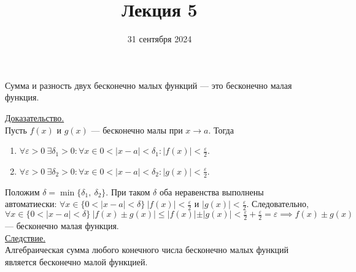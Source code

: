 \documentclass{article}
\title{Лекция 5}
\author{}
\date{31 сентября 2024}
\begin{document}
\maketitle

\begin{theorem}
    Сумма и разность двух бесконечно малых функций --- это бесконечно малая функция.
\end{theorem}
\noindent
\underline{Доказательство.}\\
Пусть \(f(x)\) и \(g(x)\) --- бесконечно малы при \(x \to a\). Тогда
\begin{enumerate}
    \item \(\displaystyle \forall \varepsilon > 0\ \exists \delta_{1} > 0 : \forall x \in 0 < \vert x - a \vert < \delta_{1}: \vert f(x) \vert < \frac{\varepsilon}{2}\). 
    \item \(\displaystyle \forall \varepsilon > 0\ \exists \delta_{2} > 0 : \forall x \in 0 < \vert x - a \vert < \delta_{2}: \vert g(x) \vert < \frac{\varepsilon}{2}\). 
\end{enumerate}
\noindent
Положим \(\delta = \min\{\delta_{1},\ \delta_{2}\}\). При таком \(\delta \) оба неравенства выполнены автоматиески: \(\displaystyle \forall x \in \{0 < \vert x - a \vert < \delta\}\ \vert f(x) \vert < \frac{\varepsilon}{2}\) и \(\displaystyle \vert g(x) \vert < \frac{\varepsilon}{2}\). 
Следовательно, \(\displaystyle \forall x \in \{0 < \vert x - a \vert < \delta\}\ \vert f(x) \pm g(x) \vert \leq \vert f(x) \vert \pm \vert g(x) \vert < \frac{\varepsilon}{2} + \frac{\varepsilon}{2} = \varepsilon \implies f(x) \pm g(x)\) --- бесконечно малая функция.\\
\underline{Следствие.}\\
Алгебраическая сумма любого конечного числа бесконечно малых функций является бесконечно малой функцией.
\end{document}
